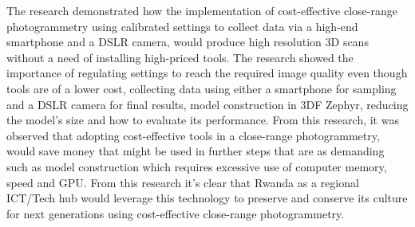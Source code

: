 \documentclass[a4paper, 12pt]{article}
\begin{document}
The research demonstrated how the implementation of cost-effective close-range photogrammetry using calibrated settings to collect data via a high-end smartphone and a DSLR camera, would produce high resolution 3D scans without a need of installing high-priced tools. The research showed the importance of regulating settings to reach the required image quality even though tools are of a lower cost, collecting data using either a smartphone for sampling and a DSLR camera for final results, model construction in 3DF Zephyr, reducing the model's size and how to evaluate its performance. From this research, it was observed that adopting cost-effective tools in a close-range photogrammetry, would save money that might be used in further steps that are as demanding such as model construction which requires excessive use of computer memory, speed and GPU. From this research it's clear that Rwanda as a regional ICT/Tech hub \cite{rwtechub} would leverage this technology to preserve and conserve its culture for next generations using cost-effective close-range photogrammetry.

\printbibliography
\end{document}
